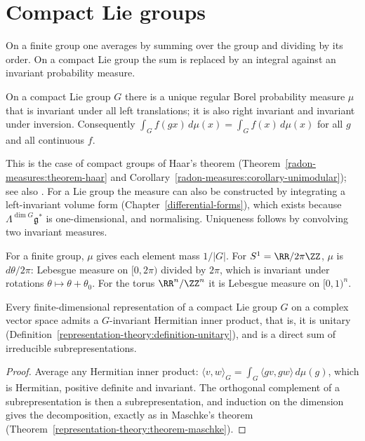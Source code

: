 \section{Compact Lie groups}\label{lie-groups:section-compact}

On a finite group one averages by summing over the group and dividing by its order. On a compact Lie group the sum is replaced by an integral against an
invariant probability measure.

\begin{theorem}\label{lie-groups:theorem-haar}
On a compact Lie group $G$ there is a unique regular Borel probability measure $\mu$ that is invariant under all left translations; it is also right invariant and invariant under inversion. Consequently
$\int_Gf(gx)\,d\mu(x) = \int_Gf(x)\,d\mu(x)$ for all $g$ and all continuous $f$.
\end{theorem}

This is the case of compact groups of Haar's theorem (Theorem~\ref{radon-measures:theorem-haar} and
Corollary~\ref{radon-measures:corollary-unimodular}); see also \cite[Chapter I]{brocker-tomdieck}. For a Lie group the measure can also be constructed by integrating a left-invariant volume form (Chapter~\ref{differential-forms}), which exists because
$\Lambda^{\dim G}\mathfrak{g}^*$ is one-dimensional, and normalising. Uniqueness follows by convolving two invariant measures.

\begin{example}\label{lie-groups:example-haar}
For a finite group, $\mu$ gives each element mass $1/|G|$. For $S^1 = \RR/2\pi\ZZ$, $\mu$ is $d\theta/2\pi$: Lebesgue measure on $[0, 2\pi)$ divided by $2\pi$,
which is invariant under rotations $\theta \mapsto \theta + \theta_0$. For the torus $\RR^n/\ZZ^n$ it is Lebesgue measure on $[0, 1)^n$.
\end{example}

\begin{corollary}\label{lie-groups:corollary-averaging}
Every finite-dimensional representation of a compact Lie group $G$ on a complex vector space admits a $G$-invariant Hermitian inner product, that is, it is unitary (Definition~\ref{representation-theory:definition-unitary}), and is a direct sum of irreducible subrepresentations.
\end{corollary}

\begin{proof}
Average any Hermitian inner product: $\langle v, w \rangle_G = \int_G\langle gv, gw \rangle\,d\mu(g)$, which is Hermitian, positive definite and invariant. The orthogonal complement of a subrepresentation is
then a subrepresentation, and induction on the dimension gives the decomposition, exactly as in Maschke's theorem (Theorem~\ref{representation-theory:theorem-maschke}).
\end{proof}

